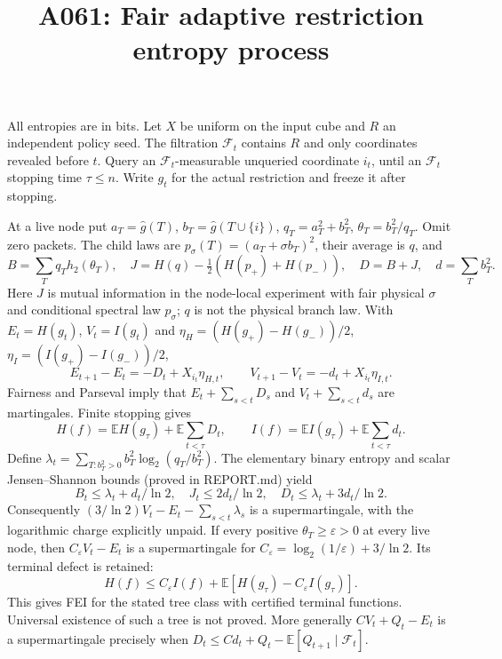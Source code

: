 \documentclass{article}
\begin{document}
\title{A061: Fair adaptive restriction entropy process}\maketitle
All entropies are in bits. Let $X$ be uniform on the input cube and $R$ an independent policy seed. The filtration $\mathcal F_t$ contains $R$ and only coordinates revealed before $t$. Query an $\mathcal F_t$-measurable unqueried coordinate $i_t$, until an $\mathcal F_t$ stopping time $\tau\le n$. Write $g_t$ for the actual restriction and freeze it after stopping.

At a live node put $a_T=\widehat g(T)$, $b_T=\widehat g(T\cup\{i\})$, $q_T=a_T^2+b_T^2$, $\theta_T=b_T^2/q_T$. Omit zero packets. The child laws are $p_\sigma(T)=(a_T+\sigma b_T)^2$, their average is $q$, and
\[
 B=\sum_Tq_Th_2(\theta_T),\quad J=H(q)-\tfrac12(H(p_+)+H(p_-)),\quad D=B+J,\quad d=\sum_Tb_T^2.
\]
Here $J$ is mutual information in the node-local experiment with fair physical $\sigma$ and conditional spectral law $p_\sigma$; $q$ is not the physical branch law. With $E_t=H(g_t)$, $V_t=I(g_t)$ and $\eta_H=(H(g_+)-H(g_-))/2$, $\eta_I=(I(g_+)-I(g_-))/2$,
\[
 E_{t+1}-E_t=-D_t+X_{i_t}\eta_{H,t},\qquad V_{t+1}-V_t=-d_t+X_{i_t}\eta_{I,t}.
\]
Fairness and Parseval imply that $E_t+\sum_{s<t}D_s$ and $V_t+\sum_{s<t}d_s$ are martingales. Finite stopping gives
\[
 H(f)=\mathbb EH(g_\tau)+\mathbb E\sum_{t<\tau}D_t,\qquad I(f)=\mathbb EI(g_\tau)+\mathbb E\sum_{t<\tau}d_t.
\]
Define $\lambda_t=\sum_{T:b_T^2>0}b_T^2\log_2(q_T/b_T^2)$. The elementary binary entropy and scalar Jensen--Shannon bounds (proved in REPORT.md) yield
\[
 B_t\le\lambda_t+d_t/\ln2,\quad J_t\le2d_t/\ln2,\quad D_t\le\lambda_t+3d_t/\ln2.
\]
Consequently $(3/\ln2)V_t-E_t-\sum_{s<t}\lambda_s$ is a supermartingale, with the logarithmic charge explicitly unpaid. If every positive $\theta_T\ge\varepsilon>0$ at every live node, then $C_\varepsilon V_t-E_t$ is a supermartingale for $C_\varepsilon=\log_2(1/\varepsilon)+3/\ln2$. Its terminal defect is retained:
\[
 H(f)\le C_\varepsilon I(f)+\mathbb E[H(g_\tau)-C_\varepsilon I(g_\tau)].
\]
This gives FEI for the stated tree class with certified terminal functions. Universal existence of such a tree is not proved. More generally $CV_t+Q_t-E_t$ is a supermartingale precisely when $D_t\le Cd_t+Q_t-\mathbb E[Q_{t+1}\mid\mathcal F_t]$.
\end{document}
